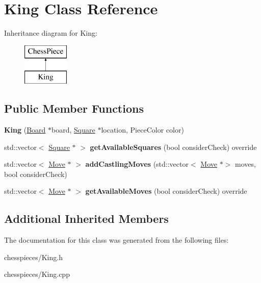 \hypertarget{class_king}{}\section{King Class Reference}
\label{class_king}
Inheritance diagram for King\+:\begin{figure}[H]
\begin{center}
\leavevmode
\includegraphics[height=2.000000cm]{class_king}
\end{center}
\end{figure}
\subsection*{Public Member Functions}
\begin{DoxyCompactItemize}
\item 
\mbox{\label{class_king_aadb14b6b3940ffa4b824a7d48cdb5432}} 
{\bfseries King} (\mbox{\hyperlink{class_board}{Board}} $\ast$board, \mbox{\hyperlink{class_square}{Square}} $\ast$location, Piece\+Color color)
\item 
\mbox{\label{class_king_a84fa2e4cc019a050ec0b973b51915710}} 
std\+::vector$<$ \mbox{\hyperlink{class_square}{Square}} $\ast$ $>$ {\bfseries get\+Available\+Squares} (bool consider\+Check) override
\item 
\mbox{\label{class_king_a9a4b9b423ae1bf7b9d199f411addaebc}} 
std\+::vector$<$ \mbox{\hyperlink{class_move}{Move}} $\ast$ $>$ {\bfseries add\+Castling\+Moves} (std\+::vector$<$ \mbox{\hyperlink{class_move}{Move}} $\ast$$>$ moves, bool consider\+Check)
\item 
\mbox{\label{class_king_a7cb7eec2bcc39f107c9e91a382881bdc}} 
std\+::vector$<$ \mbox{\hyperlink{class_move}{Move}} $\ast$ $>$ {\bfseries get\+Available\+Moves} (bool consider\+Check) override
\end{DoxyCompactItemize}
\subsection*{Additional Inherited Members}


The documentation for this class was generated from the following files\+:\begin{DoxyCompactItemize}
\item 
chesspieces/King.\+h\item 
chesspieces/King.\+cpp\end{DoxyCompactItemize}
